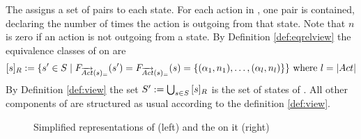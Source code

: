 \documentclass[preview]{standalone}
\begin{document}
The \grpfctN assigns a set of pairs to each state. For each action in \actions, one pair is contained, declaring the number of times the action is outgoing from that state. Note that $n$ is zero if an action is not outgoing from a state.
By Definition \ref{def:eqrelview} the equivalence classes of \eqrelview on \states are 
\[
	\eqclassv := \{\state' \in \states \mid \gfctstrongoutactident(\state') = \gfctstrongoutactident(\state) = \{(\action_1, \numoutact_1), \dots, (\action_l, \numoutact_l)\}\} \text{ where } l = |\actions|
\]
By Definition \ref{def:view} the set ${S}' := \bigcup_{{s} \in {S}} {{[{s}]_{{R}}}}$ is the set of states of \viewstrongoutactident. All other components of \viewstrongoutactident are structured as usual according to the definition \ref{def:view}.

\begin{figure}[!htb]
	\begin{minipage}{.5\textwidth}
		\hspace{5mm}
		
	\end{minipage}%
	\begin{minipage}{.5\textwidth}		
		\hspace{5mm}
		
	\end{minipage}
	
	\caption{Simplified representations of \mdp (left) and the \viewN \viewstrongoutactident on it (right)}
	\label{fig:outActIdentStrongAfter}

\end{figure}
\end{document}
